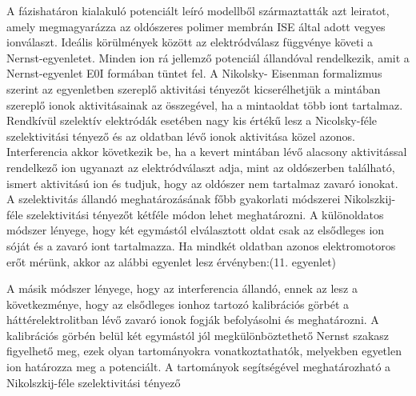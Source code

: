  A fázishatáron kialakuló potenciált leíró modellből származtatták azt leiratot, amely megmagyarázza az oldószeres polimer membrán ISE által adott vegyes ionválaszt. Ideális körülmények között az elektródválasz függvénye követi a Nernst-egyenletet. Minden ion rá jellemző potenciál állandóval rendelkezik, amit a Nernst-egyenlet E0I formában tüntet fel.  A Nikolsky- Eisenman formalizmus szerint az egyenletben szereplő aktivitási tényezőt kicserélhetjük a mintában szereplő ionok aktivitásainak az összegével, ha a mintaoldat több iont tartalmaz. Rendkívül szelektív elektródák esetében nagy kis értékű lesz a Nicolsky-féle szelektivitási tényező és az oldatban lévő ionok aktivitása közel azonos. Interferencia akkor következik be, ha a kevert mintában lévő alacsony aktivitással rendelkező ion ugyanazt az elektródválaszt adja, mint az oldószerben található, ismert aktivitású ion és tudjuk, hogy az oldószer nem tartalmaz zavaró ionokat.  
A szelektivitás állandó meghatározásának főbb gyakorlati módszerei
Nikolszkij-féle szelektivitási tényezőt kétféle módon lehet meghatározni. A különoldatos módszer lényege, hogy két egymástól elválasztott oldat csak az elsődleges ion sóját és a zavaró iont tartalmazza.  Ha mindkét oldatban azonos elektromotoros erőt mérünk, akkor az alábbi egyenlet lesz érvényben:(11. egyenlet)

A másik módszer lényege, hogy az interferencia állandó, ennek az lesz a következménye, hogy az elsődleges ionhoz tartozó kalibrációs görbét a háttérelektrolitban lévő zavaró ionok fogják befolyásolni és meghatározni. A kalibrációs görbén belül két egymástól jól megkülönböztethető Nernst szakasz figyelhető meg, ezek olyan tartományokra vonatkoztathatók, melyekben egyetlen ion határozza meg a potenciált. A tartományok segítségével meghatározható a Nikolszkij-féle szelektivitási tényező 
